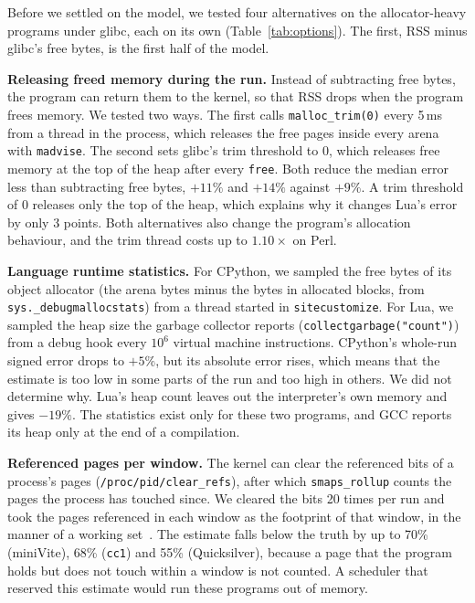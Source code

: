 \documentclass[11pt]{article}
\newcommand{\tabref}[1]{Table~\ref{#1}}
\begin{document}
Before we settled on the model, we tested four alternatives on the allocator-heavy programs under glibc, each on its
own (\tabref{tab:options}). The first, RSS minus glibc's free bytes, is the first half of the model.

\textbf{Releasing freed memory during the run.} Instead of subtracting free bytes, the program can return them to the
kernel, so that RSS drops when the program frees memory. We tested two ways. The first calls \texttt{malloc\_trim(0)}
every 5\,ms from a thread in the process, which releases the free pages inside every arena with \texttt{madvise}. The
second sets glibc's trim threshold to 0, which releases free memory at the top of the heap after every \texttt{free}.
Both reduce the median error less than subtracting free bytes, $+11\%$ and $+14\%$ against $+9\%$. A trim threshold of
0 releases only the top of the heap, which explains why it changes Lua's error by only 3 points. Both alternatives
also change the program's allocation behaviour, and the trim thread costs up to $1.10\times$ on Perl.

\textbf{Language runtime statistics.} For CPython, we sampled the free bytes of its object allocator (the arena bytes
minus the bytes in allocated blocks, from \texttt{sys.\_debugmallocstats}) from a thread started in
\texttt{sitecustomize}. For Lua, we sampled the heap size the garbage collector reports
(\texttt{collectgarbage("count")}) from a debug hook every $10^6$ virtual machine instructions. CPython's whole-run
signed error drops to $+5\%$, but its absolute error rises, which means that the estimate is too low in some parts of
the run and too high in others. We did not determine why. Lua's heap count leaves out the interpreter's own memory and
gives $-19\%$. The statistics exist only for these two programs, and GCC reports its heap only at the end of a
compilation.

\textbf{Referenced pages per window.} The kernel can clear the referenced bits of a process's pages
(\texttt{/proc/pid/clear\_refs}), after which \texttt{smaps\_rollup} counts the pages the process has touched since. We
cleared the bits 20 times per run and took the pages referenced in each window as the footprint of that window, in the
manner of a working set~\cite{denning1968}. The estimate falls below the truth by up to 70\% (miniVite), 68\%
(\texttt{cc1}) and 55\% (Quicksilver), because a page that the program holds but does not touch within a window is not
counted. A scheduler that reserved this estimate would run these programs out of memory.
\end{document}
